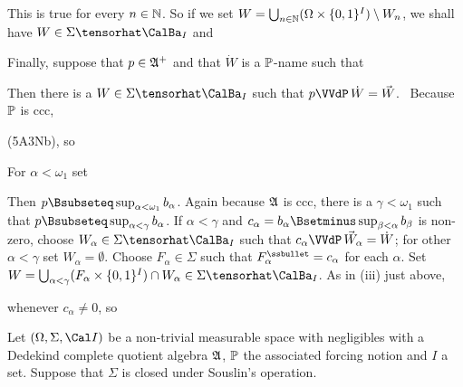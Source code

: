 {This is true for every $n\in\Bbb N$.   So if we set
$W=\bigcup_{n\in\Bbb N}(\Omega\times\{0,1\}^I)\setminus W_n$,
we shall have $W\in\Sigma\tensorhat\CalBa_I$ and


\medskip

 Finally, suppose that $p\in\frak A^+$ and that $\dot W$
is a $\Bbb P$-name such that


\noindent Then there is a $W\in\Sigma\tensorhat\CalBa_I$ such that
$p\VVdP\,\dot W=\vec W$.   \Prf\ Because $\Bbb P$ is ccc,


\noindent (5A3Nb), so


\noindent For $\alpha<\omega_1$ set


\noindent Then
$p\Bsubseteq\sup_{\alpha<\omega_1}b_{\alpha}$.   Again because $\frak A$ is
ccc, there is a $\gamma<\omega_1$ such that
$p\Bsubseteq\sup_{\alpha<\gamma}b_{\alpha}$.   If $\alpha<\gamma$ and
$c_{\alpha}=b_{\alpha}\Bsetminus\sup_{\beta<\alpha}b_{\beta}$ is non-zero,
choose $W_{\alpha}\in\Sigma\tensorhat\CalBa_I$ such that
$c_{\alpha}\VVdP\,\vec W_{\alpha}=\dot W$;  for other $\alpha<\gamma$
set $W_{\alpha}=\emptyset$.   Choose $F_{\alpha}\in\Sigma$ such that
$F_{\alpha}^{\ssbullet}=c_{\alpha}$ for each $\alpha$.
Set $W=\bigcup_{\alpha<\gamma}(F_{\alpha}\times\{0,1\}^I)\cap W_{\alpha}
\in\Sigma\tensorhat\CalBa_I$.   As in (iii) just above,


\noindent whenever $c_{\alpha}\ne 0$, so

}%

 Let $(\Omega,\Sigma,\Cal I)$ be a non-trivial
measurable space with negligibles with a Dedekind complete quotient
algebra $\frak A$,
$\Bbb P$ the associated forcing notion and $I$ a set.   Suppose
that $\Sigma$ is closed under Souslin's operation.

